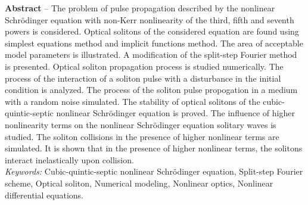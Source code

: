 \documentclass[12pt,a4paper]{article}
\begin{document}
\bigskip
\textbf{Abstract} --
{The problem of pulse propagation described by the nonlinear Schr\"{o}dinger equation with non-Kerr nonlinearity of the third, fifth and seventh powers is considered. Optical solitons of the considered equation are found using simplest equations method and implicit functions method. The area of acceptable model parameters is illustrated. A modification of the split-step Fourier method is presented. Optical soliton propagation process is studied numerically. The process of the interaction of a soliton pulse with a disturbance in the initial condition is analyzed. The process of the soliton pulse propogation in a medium with a random noise simulated. The stability of optical solitons of the cubic-quintic-septic nonlinear Schr\"{o}dinger equation is proved. The influence of higher nonlinearity terms on the nonlinear Schr\"{o}dinger equation solitary waves is studied. The soliton collisions in the presence of higher nonlinear terms are simulated. It is shown that in the presence of higher nonlinear terms, the solitons interact inelastically upon collision.}\\

\textit{Keywords:} Cubic-quintic-septic nonlinear Schr\"{o}dinger equation, Split-step Fourier scheme, Optical soliton, Numerical modeling, Nonlinear optics, Nonlinear differential equations.
\end{document}

